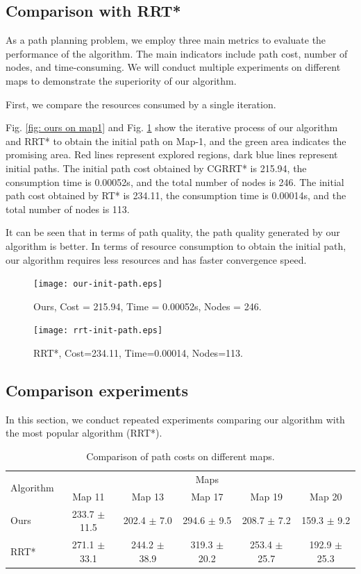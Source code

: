 \documentclass[smallcondensed]{svjour3}     %
\begin{document}
\subsection{Comparison with RRT*}
As a path planning problem, we employ three main metrics to evaluate the performance of the algorithm.
The main indicators include path cost, number of nodes, and time-consuming.
We will conduct multiple experiments on different maps to demonstrate the superiority of our algorithm.

First, we compare the resources consumed by a single iteration.

Fig. \ref{fig: ours on map1} and Fig. \ref{fig: rrt-star on map1} show the iterative process of our algorithm and RRT* to obtain the initial path on Map-1, and the green area indicates the promising area.
Red lines represent explored regions, dark blue lines represent initial paths.
The initial path cost obtained by CGRRT* is 215.94, the consumption time is 0.00052s, and the total number of nodes is 246.
The initial path cost obtained by RT* is 234.11, the consumption time is 0.00014s, and the total number of nodes is 113.

It can be seen that in terms of path quality, the path quality generated by our algorithm is better.
In terms of resource consumption to obtain the initial path, our algorithm requires less resources and has faster convergence speed.
\begin{figure}[htbp]
	\centering
	\begin{minipage}[t]{0.45\textwidth}
		\centering
		\texttt{[image: our-init-path.eps]}
		\caption{Ours, Cost = 215.94, Time = 0.00052s, Nodes = 246.}
		\label{fig: ours on map1}
	\end{minipage}
	\begin{minipage}[t]{0.45\textwidth}
		\centering
		\texttt{[image: rrt-init-path.eps]}
		\caption{RRT*, Cost=234.11, Time=0.00014, Nodes=113.}
		\label{fig: rrt-star on map1}
	\end{minipage}
\end{figure}

\subsection{Comparison experiments}
In this section, we conduct repeated experiments comparing our algorithm with the most popular algorithm (RRT*).

\begin{table}[ht]
	\centering
	\begin{tabular}{l|c|c|c|c|c}
	\toprule
	\multirow{2}{*}{Algorithm} & \multicolumn{5}{c}{Maps} \\
	\cline{2-6}
	& Map 11 & Map 13 & Map 17 & Map 19 & Map 20 \\
	\midrule
	Ours & 233.7 $\pm$ 11.5 & 202.4 $\pm$ 7.0 & 294.6 $\pm$ 9.5 & 208.7 $\pm$ 7.2 & 159.3 $\pm$ 9.2 \\
	\midrule
	RRT* & 271.1 $\pm$ 33.1 & 244.2 $\pm$ 38.9 & 319.3 $\pm$ 20.2 & 253.4 $\pm$ 25.7 & 192.9 $\pm$ 25.3 \\
	\bottomrule
	\end{tabular}
	\caption{Comparison of path costs on different maps.}
	\label{tab: costs}
\end{table}
\end{document}
